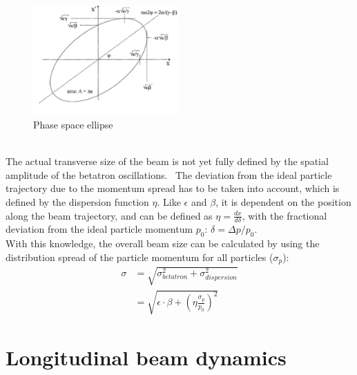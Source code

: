 \begin{figure}[h]
\centering
\includegraphics[width=0.5\textwidth]{Figures/PhaseSpaceEllipse_w_AxisTitles.png}
\caption[Phase space ellipse]{Phase space ellipse~\cite[based on p. 158]{Wiedemann}}
\label{fig:PhaseSpaceEllipse}
\end{figure}
\\
The actual transverse size of the beam is not yet fully defined by the spatial amplitude of the betatron oscillations.~\cite[cf. p. 108ff]{Conte}
The deviation from the ideal particle trajectory due to the momentum spread has to be taken into account, which is defined by the dispersion function $\eta$.
Like $\epsilon$ and $\beta$, it is dependent on the position along the beam trajectory, and can be defined as $\eta = \frac{dx}{d\delta}$, with the fractional deviation from the ideal particle momentum $p_0$: $\delta = \Delta p/p_0$.
\\
With this knowledge, the overall beam size can be calculated by using the distribution spread of the particle momentum for all particles ($\sigma_p$):
\begin{align}
 \sigma&=\sqrt{\sigma^2_{betatron}+\sigma^2_{dispersion}}\\
 &=\sqrt{\epsilon\cdot\beta+\left(\eta\frac{\sigma_p}{p_0}\right)^2}
\end{align}

\section{Longitudinal beam dynamics}
\label{AccPhysics:PhaseFocusing}

